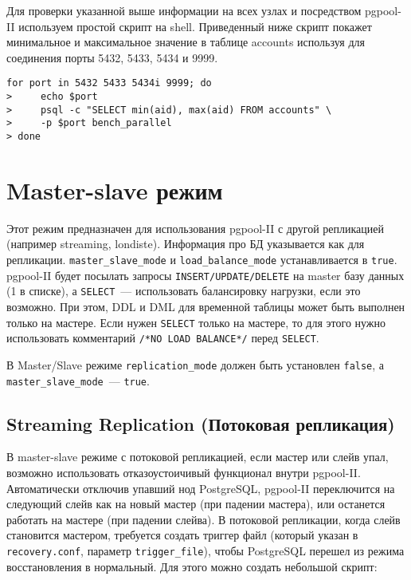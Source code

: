 Для проверки указанной выше информации на всех узлах и посредством pgpool-II используем простой скрипт на shell. Приведенный ниже скрипт покажет минимальное и максимальное значение в таблице accounts используя для соединения порты 5432, 5433, 5434 и 9999.

\begin{lstlisting}[label=lst:pgpool39,caption=Проверка параллельного запроса]
for port in 5432 5433 5434i 9999; do
>     echo $port
>     psql -c "SELECT min(aid), max(aid) FROM accounts" \
>     -p $port bench_parallel
> done
\end{lstlisting}





\section{Master-slave режим}

Этот режим предназначен для использования pgpool-II с другой репликацией (например streaming, londiste). Информация про БД указывается как для репликации. \lstinline!master_slave_mode! и \lstinline!load_balance_mode! устанавливается в \lstinline!true!. pgpool-II будет посылать запросы \lstinline!INSERT/UPDATE/DELETE! на master базу данных (1 в списке), а \lstinline!SELECT!~--- использовать балансировку нагрузки, если это возможно. При этом, DDL и DML для временной таблицы может быть выполнен только на мастере. Если нужен \lstinline!SELECT! только на мастере, то для этого нужно использовать комментарий \lstinline!/*NO LOAD BALANCE*/! перед \lstinline!SELECT!.

В Master/Slave режиме \lstinline!replication_mode! должен быть установлен \lstinline!false!, а \lstinline!master_slave_mode!~--- \lstinline!true!.

\subsection{Streaming Replication (Потоковая репликация)}

В master-slave режиме с потоковой репликацией, если мастер или слейв упал, возможно использовать отказоустоичивый функционал внутри pgpool-II. Автоматически отключив упавший нод PostgreSQL, pgpool-II переключится на следующий слейв как на новый мастер (при падении мастера), или останется работать на мастере (при падении слейва). В потоковой репликации, когда слейв становится мастером, требуется создать триггер файл (который указан в \lstinline!recovery.conf!, параметр \lstinline!trigger_file!), чтобы PostgreSQL перешел из режима восстановления в нормальный. Для этого можно создать небольшой скрипт:

